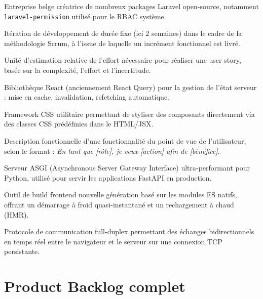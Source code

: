 \begin{description}[leftmargin=4cm, style=nextline]
  \item[Spatie]
  Entreprise belge créatrice de nombreux packages Laravel open-source, notamment
  \texttt{laravel-permission} utilisé pour le RBAC système.

  \item[Sprint]
  Itération de développement de durée fixe (ici 2 semaines) dans le cadre de
  la méthodologie Scrum, à l'issue de laquelle un incrément fonctionnel est livré.

  \item[Story Points]
  Unité d'estimation relative de l'effort nécessaire pour réaliser une user story,
  basée sur la complexité, l'effort et l'incertitude.

  \item[TanStack Query]
  Bibliothèque React (anciennement React Query) pour la gestion de l'état serveur :
  mise en cache, invalidation, refetching automatique.

  \item[TailwindCSS]
  Framework CSS utilitaire permettant de styliser des composants directement via
  des classes CSS prédéfinies dans le HTML/JSX.

  \item[User Story]
  Description fonctionnelle d'une fonctionnalité du point de vue de l'utilisateur,
  selon le format : \textit{En tant que [rôle], je veux [action] afin de [bénéfice]}.

  \item[Uvicorn]
  Serveur ASGI (Asynchronous Server Gateway Interface) ultra-performant pour Python,
  utilisé pour servir les applications FastAPI en production.

  \item[Vite]
  Outil de build frontend nouvelle génération basé sur les modules ES natifs,
  offrant un démarrage à froid quasi-instantané et un rechargement à chaud (HMR).

  \item[WebSocket]
  Protocole de communication full-duplex permettant des échanges bidirectionnels
  en temps réel entre le navigateur et le serveur sur une connexion TCP persistante.

\end{description}

\chapter{Product Backlog complet}
\label{ann:product_backlog}

